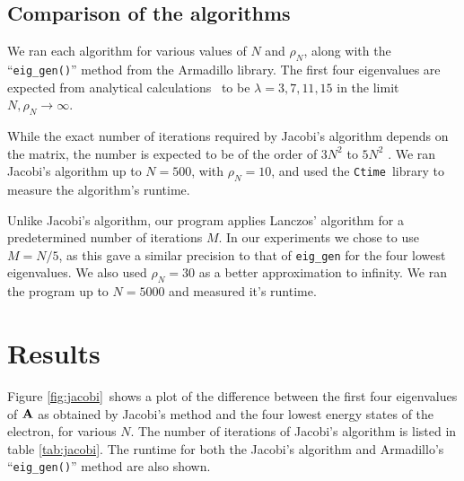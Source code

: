 \documentclass[a4paper,10pt,twocolumn]{article}
\begin{document}
\subsection*{Comparison of the algorithms}

We ran each algorithm for various values of $N$ and $\rho_N$, along with the ``\texttt{eig\_gen()}'' method from the Armadillo library. The first four eigenvalues are expected from analytical calculations \cite{labtext} to be $\lambda = 3, 7, 11, 15$ in the limit $N,\rho_N\to\infty$.  

While the exact number of iterations required by Jacobi's algorithm depends on the matrix, the number is expected to be of the order of $3N^2$ to $5N^2$ \cite{lecture}. We ran Jacobi's algorithm up to $N=500$, with $\rho_N = 10$, and used the \texttt{Ctime} library to measure the algorithm's runtime.

Unlike Jacobi's algorithm, our program applies Lanczos' algorithm for a predetermined number of iterations $M$. In our experiments we chose to use $M=N/5$, as this gave a similar precision to that of \texttt{eig\_gen} for the four lowest eigenvalues. We also used $\rho_N = 30$ as a better approximation to infinity. We ran the program up to $N=5000$ and measured it's runtime.  

%
%
%
\section*{Results}

Figure \ref{fig:jacobi} shows a plot of the difference between the first four eigenvalues of $\vb{A}$ as obtained by Jacobi's method and the four lowest energy states of the electron, for various $N$. The number of iterations of Jacobi's algorithm is listed in table \ref{tab:jacobi}. 
The runtime for both the Jacobi's algorithm and Armadillo's ``\texttt{eig\_gen()}'' method are also shown.  
\end{document}
